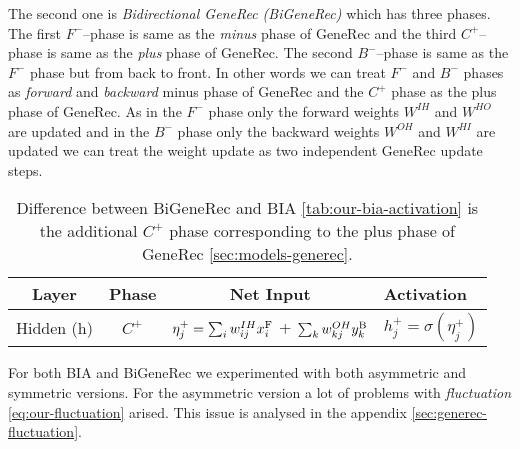 The second one is \emph{Bidirectional GeneRec (BiGeneRec)} which has three phases. The first $F^{-}$--phase is same as the \emph{minus} phase of GeneRec and the third $C^{+}$--phase is same as the \emph{plus} phase of GeneRec. The second $B^{-}$--phase is same as the $F^{-}$ phase but from back to front. In other words we can treat $F^{-}$ and $B^{-}$ phases as \emph{forward} and \emph{backward} minus phase of GeneRec and the $C^{+}$ phase as the plus phase of GeneRec. As in the $F^{-}$ phase only the forward weights $W^{IH}$ and $W^{HO}$ are updated and in the $B^{-}$ phase only the backward weights $W^{OH}$ and $W^{HI}$ are updated we can treat the weight update as two independent GeneRec update steps. 

\begin{table}[H] 
  \centering
  \begin{tabular}{|cccl|}
    \hline
    Layer & Phase & Net Input & Activation\\
    \hline
    Hidden (h)   &  $C^{+}$  & $\eta^{+}_j = \sum_{i}w_{ij}^{IH}x^{\rm F}_i$ + $\sum_k w_{kj}^{OH}y^{\rm B}_k$ & $h^{+}_{j} = \sigma(\eta^{+}_j)$ \\
    \hline
  \end{tabular}
  \caption{Difference between BiGeneRec and BIA \ref{tab:our-bia-activation} is the additional $C^{+}$ phase corresponding to the plus phase of GeneRec \ref{sec:models-generec}.} 
  \label{tab:our-bigenerec-activation}
\end{table} 

For both BIA and BiGeneRec we experimented with both asymmetric and symmetric versions. For the asymmetric version a lot of problems with \emph{fluctuation} \ref{eq:our-fluctuation} arised. This issue is analysed in the appendix \ref{sec:generec-fluctuation}. 

